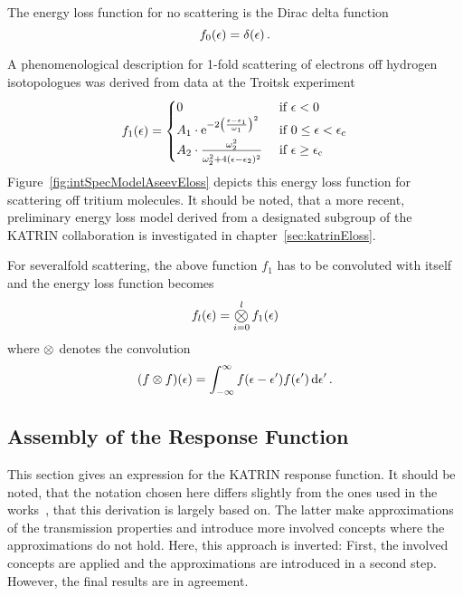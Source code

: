 The energy loss function for no scattering is the Dirac delta function~\cite{Kleesiek2019}
\begin{equation}
f_0(\epsilon) = \delta(\epsilon)
\text{\,.}
\end{equation}

A phenomenological description for 1-fold scattering of electrons off hydrogen isotopologues was derived from data at the Troitsk experiment~\cite{Aseev2000, Abdurashitov2017}
\begin{equation}
\label{eq:intSpecModelAseevEloss}
	f_1(\epsilon) =
	\begin{cases}
		0 &\text{ if } \epsilon < 0 \\
		A_1 \cdot
		\euler^{ 
			-2\left(
			\frac{\epsilon-\epsilon_1}{\omega_1}
			\right)^2
		}
		&\text{ if } 0 \leq \epsilon < \epsCrit \\
		A_2 \cdot
		\frac{
			\omega_2^2
		}{
			\omega_2^2+4(\epsilon-\epsilon_2)^2 
			\vphantom{\text{\large A}}
		} 
		&\text{ if } \epsilon \geq \epsCrit
	\end{cases}
\end{equation}
Figure~\ref{fig:intSpecModelAseevEloss} depicts this energy loss function for scattering off tritium molecules. It should be noted, that a more recent, preliminary energy loss model derived from a designated subgroup of the KATRIN collaboration is investigated in chapter~\ref{sec:katrinEloss}.

For severalfold scattering, the above function $f_1$ has to be convoluted with itself and the energy loss function becomes~\cite{Kleesiek2019}
\begin{equation}
	\label{eq:intSpecModelConvolutedEloss}
	f_l(\epsilon) = \Conv_{i=0}^{l} f_1(\epsilon)
\end{equation}
where $\otimes$ denotes the convolution
\begin{equation}
(f \otimes f)(\epsilon) = 
\int_{-\infty}^{\infty}  
	f(\epsilon-\epsilon^\prime)f(\epsilon^\prime)
\mathop{}\!\mathrm{d} \epsilon^\prime 
\text{\,.} 
\end{equation}

\subsection{Assembly of the Response Function}
\label{sec:intSpecModelResponseReconciliation}
This section gives an expression for the KATRIN response function. It should be noted, that the notation chosen here differs slightly from the ones used in the works~\cite{Groh2015,Kleesiek2019}, that this derivation is largely based on. The latter make approximations of the transmission properties and introduce more involved concepts where the approximations do not hold. Here, this approach is inverted: First, the involved concepts are applied and the approximations are introduced in a second step. However, the final results are in agreement.

